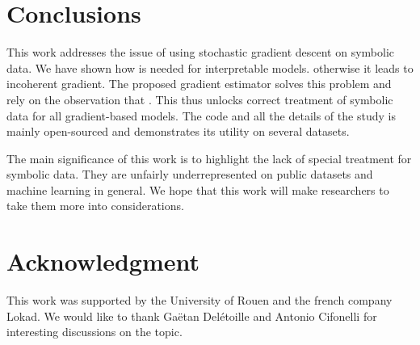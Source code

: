 \section{Conclusions}\label{sec:conclusion}









This work addresses the issue of using stochastic gradient descent on symbolic data. We have shown how \ohe is needed for interpretable models. \secondContrib  otherwise it leads to incoherent gradient. The proposed gradient estimator solves this problem and rely on the observation that \mainContrib. This thus unlocks correct treatment of symbolic data for all gradient-based models. The code and all the details of the study is mainly open-sourced and demonstrates its utility on several datasets. 



The main significance of this work is to highlight the lack of special treatment for symbolic data. They are unfairly underrepresented on public datasets and machine learning in general. We hope that this work will make researchers to take them more into considerations. 




\section*{Acknowledgment}
This work was supported by the University of Rouen and the french company Lokad. We would like to thank Gaëtan Delétoille and Antonio Cifonelli for interesting discussions on the topic. 